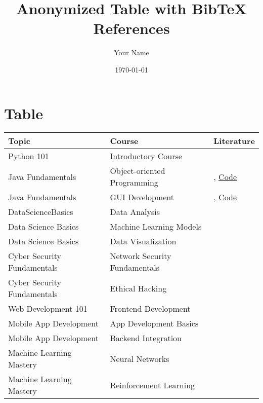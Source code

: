 \documentclass{article}
\begin{document}
\title{Anonymized Table with BibTeX References}
\author{Your Name}
\date{\today}
\maketitle

\section{Table}

\begin{tabular}{lll}
  Topic  & Course  & Literature \\
  \hline   
  Python 101  &  Introductory Course  &  \cite{smithPython101Introduction2023a, smithPython101Advanced2023} \\
  Java Fundamentals  & Object-oriented Programming & \cite{jonesJavaFundamentalsBeginners2023}, \href{https://github.com/example/JavaFundamentals}{Code} \\
  Java Fundamentals &  GUI Development & \cite{jonesJavaFundamentalsBeginners2023}, \href{https://github.com/example/JavaFundamentals}{Code} \\
  
  DataScienceBasics &  Data Analysis   & \cite{brownDataScienceBasics2023}  \\
  Data Science Basics &  Machine Learning Models  &  \cite{brownDataScienceBasics2023}  \\
  Data Science Basics &  Data Visualization  &  \cite{brownDataScienceBasics2023}  \\
  
  Cyber Security Fundamentals &  Network Security Fundamentals  & \cite{wilsonCyberSecurityFundamentals2023} \\
  Cyber Security Fundamentals &  Ethical Hacking     & \cite{wilsonCyberSecurityFundamentals2023} \\
  
  Web Development 101 &  Frontend Development  & \cite{johnsonWebDevelopment1012023} \\

  Mobile App Development &  App Development Basics    & \cite{thomasMobileAppDevelopmentBasics2023} \\
  Mobile App Development &  Backend Integration   & \cite{thomasMobileAppDevelopmentBasics2023} \\
  

   \hline
   \hline
   Machine Learning Mastery &   Neural Networks  &  \cite{wilsonMachineLearningMastery2023} \\
   Machine Learning Mastery &   Reinforcement Learning    &  \cite{wilsonMachineLearningMastery2023} \\
  

\end{tabular}
\end{document}
